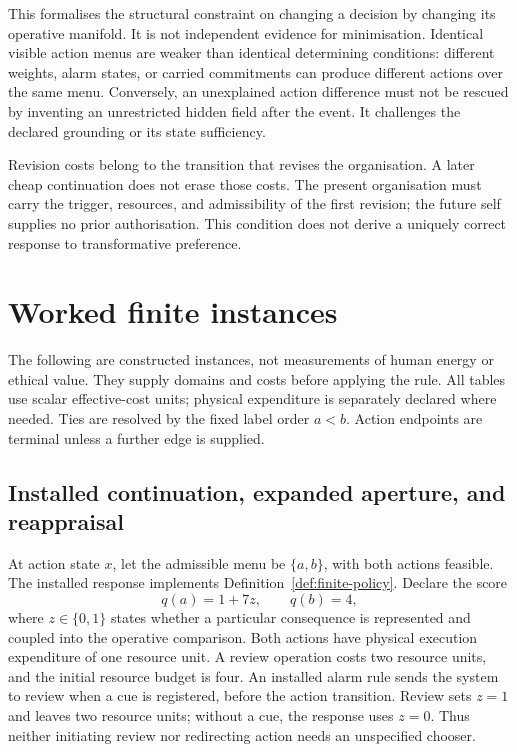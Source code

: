 \documentclass[11pt,a4paper]{article}
\theoremstyle{remark}
\begin{document}
This formalises the structural constraint on changing a decision by changing
its operative manifold. It is not independent evidence for minimisation.
Identical visible action menus are weaker than identical determining
conditions: different weights, alarm states, or carried commitments can
produce different actions over the same menu. Conversely, an unexplained
action difference must not be rescued by inventing an unrestricted hidden
field after the event. It challenges the declared grounding or its state
sufficiency.

Revision costs belong to the transition that revises the organisation. A
later cheap continuation does not erase those costs. The present organisation
must carry the trigger, resources, and admissibility of the first revision;
the future self supplies no prior authorisation. This condition does not
derive a uniquely correct response to transformative preference.

\section{Worked finite instances}\label{sec:examples}

The following are constructed instances, not measurements of human energy or
ethical value. They supply domains and costs before applying the rule. All
tables use scalar effective-cost units; physical expenditure is separately
declared where needed. Ties are resolved by the fixed label order \(a<b\).
Action endpoints are terminal unless a further edge is supplied.

\subsection{Installed continuation, expanded aperture, and reappraisal}

At action state \(x\), let the admissible menu be \(\{a,b\}\), with both
actions feasible. The installed response implements
Definition~\ref{def:finite-policy}. Declare the score
\[
q(a)=1+7z,\qquad q(b)=4,
\]
where \(z\in\{0,1\}\) states whether a particular consequence is represented
and coupled into the operative comparison. Both actions have physical
execution expenditure of one resource unit. A review operation costs two
resource units, and the initial resource budget is four. An installed alarm
rule sends the system to review when a cue is registered, before the action
transition. Review sets \(z=1\) and leaves two resource units; without a cue,
the response uses \(z=0\). Thus neither initiating review nor redirecting
action needs an unspecified chooser.
\end{document}
